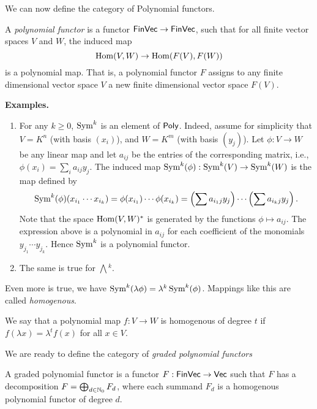 \documentclass[../main.tex]{subfiles}
\begin{document}
We can now define the category of Polynomial functors.
\begin{defi}
    A \emph{polynomial functor} is a functor $\textnormal{$\textsf{FinVec}$} \to \textnormal{$\textsf{FinVec}$}$, such
    that for all finite vector spaces $V$ and $W$, the induced map
    \begin{equation*}
        \operatorname{Hom}(V, W) \to \operatorname{Hom}(F(V), F(W))
    \end{equation*} is a polynomial map. 
    That is, a polynomial functor $F$ assigns to any finite dimensional vector space $V$ 
    a new finite dimensional vector space $F(V)$. 
\end{defi}

\textbf{Examples.}
\begin{enumerate}[wide, labelindent=0pt]
    \item For any $k \geq 0$, $\operatorname{Sym}^k$ is an element of $\textnormal{$\textsf{Poly}$}$. Indeed, assume for
        simplicity that $V = K^n$ (with basis $(x_i)$), and $W = K^m$ (with
        basis $(y_j)$). Let $\phi: V \to W$ be 
        any linear map and let $a_{ij}$ be the entries of the corresponding matrix, 
        i.e., $\phi(x_i) = \sum_{i} a_{ij}y_j$. 
        The induced map $\operatorname{Sym}^k(\phi): \operatorname{Sym}^k(V) \to \operatorname{Sym}^k(W)$ is the map defined by
        \begin{equation*}
            \operatorname{Sym}^k(\phi)(x_{i_1} \cdots x_{i_k}) = \phi(x_{i_1}) \cdots \phi(x_{i_k})
            = \left(\sum a_{i_1j}y_j \right) \cdots \left(\sum a_{i_kj}y_j \right). 
        \end{equation*}
        Note that the space $\operatorname{Hom}(V,W)^*$ is generated by the functions 
        $\phi \mapsto a_{ij}$. The expression above is a polynomial in $a_{ij}$ for
        each coefficient of the monomials $y_{j_1}\cdots y_{j_k}$. Hence
        $\operatorname{Sym}^k$ is a polynomial functor.
    \item The same is true for $\bigwedge{}^k$.
\end{enumerate}

Even more is true, we have $\operatorname{Sym}^k(\lambda \phi) = \lambda^k \operatorname{Sym}^k(\phi)$. 
Mappings like this are called \emph{homogenous}.
\begin{defi}
    We say that a polynomial map $f: V \to W$ is homogenous of degree $t$ if
    $f(\lambda x) = \lambda^t f(x)$ for all $x \in V$.
\end{defi}

We are ready to define the category of \emph{graded polynomial functors}

\begin{defi}
    A graded polynomial functor is a functor $F: \textnormal{$\textsf{FinVec}$} \to \textnormal{$\textsf{Vec}$}$ such that 
    $F$ has a decomposition $F = \bigoplus_{d \in \mathbb{N}_0} F_d$, where 
    each summand $F_d$ is a homogenous polynomial functor of degree $d$.
\end{defi}
\end{document}
